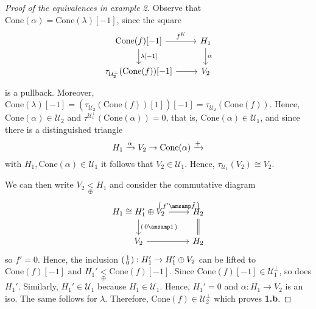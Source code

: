 \begin{proof}[Proof of the equivalences in example 2]
  Observe that $\mathrm{Cone}(\alpha)=\mathrm{Cone}(\lambda)[-1]$, since
  the square
  \begin{equation*}
    \begin{tikzcd}
      \mathrm{Cone}(f)[-1]\arrow{r}{f^K}\arrow{d}{\lambda[-1]}
        & H_1\arrow{d}{\alpha} \\
      \tau_{\mathcal{U}_2^\perp}(\mathrm{Cone}(f))[-1]\arrow{r}
        & V_2
    \end{tikzcd}
  \end{equation*}
  is a pullback. Moreover, $\mathrm{Cone}(\lambda)[-1] = (\tau_{\mathcal{U}_2}(\mathrm{Cone}(f))[1])[-1]
  =\tau_{\mathcal{U}_2}(\mathrm{Cone}(f))$. Hence, $\mathrm{Cone}(\alpha)\in \mathcal{U}_2$ and
  $\tau^{\mathcal{U}_1^\perp}(\mathrm{Cone}(\alpha))=0$, that is,
  $\mathrm{Cone}(\alpha)\in\mathcal{U}_1$, and since there is a distinguished triangle
  \begin{equation*}
    H_1\xrightarrow{\alpha} V_2\to \mathrm{Cone}(\alpha)\xrightarrow{+}
  \end{equation*}
  with $H_1,\mathrm{Cone}(\alpha)\in\mathcal{U}_1$ it follows that
  $V_2\in\mathcal{U}_1$. Hence, $\tau_{\mathcal{U}_1}(V_2)\cong V_2$.

  We can then write $V_2\underset{\oplus}{<}H_1$ and consider the commutative diagram
  \begin{equation*}
    \begin{tikzcd}
      H_1 \cong H_1'\oplus V_2\arrow{r}{
        \begin{psmallmatrix}
          f' \amsamp \tilde{f}
        \end{psmallmatrix}
      }\arrow{d}{
        \begin{psmallmatrix}
          0 \amsamp 1
        \end{psmallmatrix}
      }
        & H_2\arrow[equal]{d}\\
      V_2\arrow{r}
        & H_2
    \end{tikzcd}
  \end{equation*}
  so $f'=0$. Hence, the inclusion $
  \begin{psmallmatrix}
    1 \\ 0
  \end{psmallmatrix}:H_1'\to H_1'\oplus V_2$ can be lifted to
  $\mathrm{Cone}(f)[-1]$ and $H_1'\underset{\oplus}{<}\mathrm{Cone}(f)[-1]$.
  Since $\mathrm{Cone}(f)[-1]\in \mathcal{U}_1^\perp$, so does $H_1'$. Similarly,
  $H_1'\in\mathcal{U}_1$ because $H_1\in\mathcal{U}_1$. Hence, $H_1'=0$ and $\alpha:H_1\to V_2$ is an iso.
  The same follows for $\lambda$. Therefore, $\mathrm{Cone}(f)\in\mathcal{U}_2^\perp$ which
  proves \textbf{1.b}.
\end{proof}

